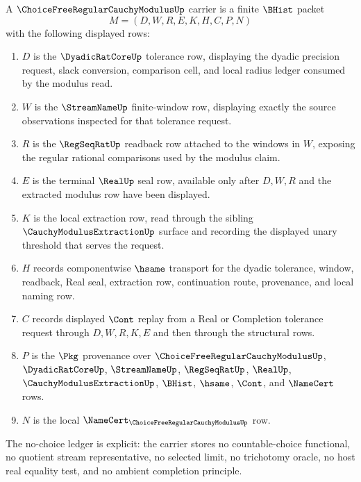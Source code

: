 \begin{definition}
\label{def:choice-free-regular-cauchy-modulus-carrier}
A $\ChoiceFreeRegularCauchyModulusUp$ carrier is a finite $\BHist$ packet
$$
M=(D,W,R,E,K,H,C,P,N)
$$
with the following displayed rows:
\begin{enumerate}
\item $D$ is the $\DyadicRatCoreUp$ tolerance row, displaying the dyadic precision request, slack conversion, comparison cell, and local radius ledger consumed by the modulus read.
\item $W$ is the $\StreamNameUp$ finite-window row, displaying exactly the source observations inspected for that tolerance request.
\item $R$ is the $\RegSeqRatUp$ readback row attached to the windows in $W$, exposing the regular rational comparisons used by the modulus claim.
\item $E$ is the terminal $\RealUp$ seal row, available only after $D,W,R$ and the extracted modulus row have been displayed.
\item $K$ is the local extraction row, read through the sibling $\CauchyModulusExtractionUp$ surface and recording the displayed unary threshold that serves the request.
\item $H$ records componentwise $\hsame$ transport for the dyadic tolerance, window, readback, Real seal, extraction row, continuation route, provenance, and local naming row.
\item $C$ records displayed $\Cont$ replay from a Real or Completion tolerance request through $D,W,R,K,E$ and then through the structural rows.
\item $P$ is the $\Pkg$ provenance over $\ChoiceFreeRegularCauchyModulusUp$, $\DyadicRatCoreUp$, $\StreamNameUp$, $\RegSeqRatUp$, $\RealUp$, $\CauchyModulusExtractionUp$, $\BHist$, $\hsame$, $\Cont$, and $\NameCert$ rows.
\item $N$ is the local $\NameCert_{\ChoiceFreeRegularCauchyModulusUp}$ row.
\end{enumerate}
The no-choice ledger is explicit: the carrier stores no countable-choice functional, no quotient stream representative, no selected limit, no trichotomy oracle, no host real equality test, and no ambient completion principle.
\end{definition}

